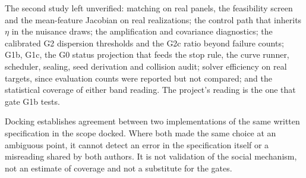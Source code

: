 The second study left unverified: matching on real panels, the feasibility screen and the mean-feature Jacobian on real realizations; the control path that inherits $\eta$ in the nuisance draws; the amplification and covariance diagnostics; the calibrated G2 dispersion thresholds and the G2c ratio beyond failure counts; G1b, G1c, the G0 status projection that feeds the stop rule, the curve runner, scheduler, sealing, seed derivation and collision audit; solver efficiency on real targets, since evaluation counts were reported but not compared; and the statistical coverage of either band reading. The project's reading is the one that gate G1b tests.

Docking establishes agreement between two implementations of the same written specification in the scope docked. Where both made the same choice at an ambiguous point, it cannot detect an error in the specification itself or a misreading shared by both authors. It is not validation of the social mechanism, not an estimate of coverage and not a substitute for the gates.
